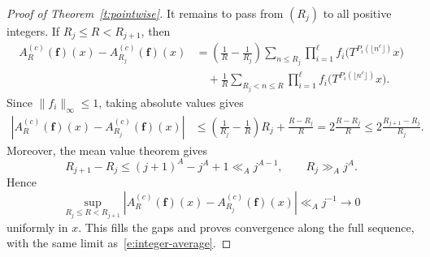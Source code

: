 \documentclass{amsart}
\newcommand{\1}{\mathbf 1}
\begin{document}
\begin{proof}[Proof of Theorem~\ref{t:pointwise}]
It remains to pass from $(R_j)$ to all positive integers.  If
$R_j\leq R<R_{j+1}$, then
\begin{align*}
 A_R^{(c)}(\mathbf f)(x)-A_{R_j}^{(c)}(\mathbf f)(x)
 &=
 \left(\frac1R-\frac1{R_j}\right)
 \sum_{n\leq R_j}\prod_{i=1}^{\ell}
 f_i\bigl(T^{P_i(\lfloor n^c\rfloor)}x\bigr)\\
 &\quad+\frac1R\sum_{R_j<n\leq R}\prod_{i=1}^{\ell}
 f_i\bigl(T^{P_i(\lfloor n^c\rfloor)}x\bigr).
\end{align*}
Since $\|f_i\|_\infty\leq1$, taking absolute values gives
\begin{align*}
 \left|A_R^{(c)}(\mathbf f)(x)-A_{R_j}^{(c)}(\mathbf f)(x)\right|
 &\leq
 \left(\frac1{R_j}-\frac1R\right)R_j+\frac{R-R_j}{R}=2\frac{R-R_j}{R}
 \leq2\frac{R_{j+1}-R_j}{R_j}.
\end{align*}
Moreover, the mean value theorem gives
\[
 R_{j+1}-R_j
 \leq (j+1)^A-j^A+1\ll_A j^{A-1},
 \qquad R_j\gg_A j^A.
\]
Hence
\[
 \sup_{R_j\leq R<R_{j+1}}
 \left|A_R^{(c)}(\mathbf f)(x)-A_{R_j}^{(c)}(\mathbf f)(x)\right|
 \ll_A j^{-1}\longrightarrow0
\]
uniformly in $x$.  This fills the gaps and proves convergence along the
full sequence, with the same limit as~\eqref{e:integer-average}.
\end{proof}
\end{document}
